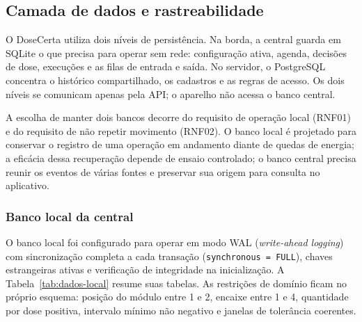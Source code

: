 \subsection{Camada de dados e rastreabilidade}\label{sec:dados_rastreabilidade}
O DoseCerta utiliza dois níveis de persistência.  Na borda, a central guarda em SQLite o que precisa para operar sem rede: configuração ativa, agenda, decisões de dose, execuções e as filas de entrada e saída. No servidor, o PostgreSQL concentra o histórico compartilhado, os cadastros e as regras de acesso. Os dois níveis se comunicam apenas pela API; o aparelho não acessa o banco central.

A escolha de manter dois bancos decorre do requisito de operação local (RNF01) e do requisito de não repetir movimento (RNF02). O banco local é projetado para conservar o registro de uma operação em andamento diante de quedas de energia; a eficácia dessa recuperação depende de ensaio controlado; o banco central precisa reunir os eventos de várias fontes e preservar sua origem para consulta no aplicativo.

\subsubsection{Banco local da central}
O banco local foi configurado para operar em modo WAL (\emph{write-ahead logging}) com sincronização completa a cada transação (\texttt{synchronous = FULL}), chaves estrangeiras ativas e verificação de integridade na inicialização. A Tabela~\ref{tab:dados-local} resume suas tabelas. As restrições de domínio ficam no próprio esquema: posição do módulo entre 1 e 2, encaixe entre 1 e 4, quantidade por dose positiva, intervalo mínimo não negativo e janelas de tolerância coerentes.

